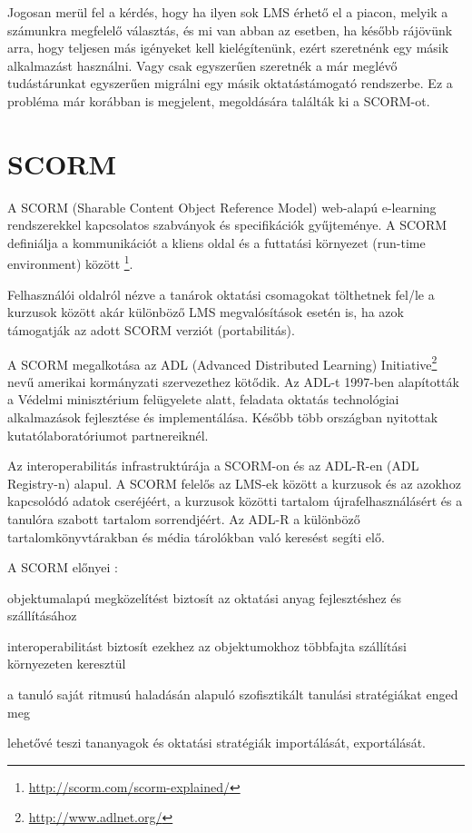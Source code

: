 Jogosan merül fel a kérdés, hogy ha ilyen sok LMS érhető el a piacon, melyik a számunkra megfelelő választás, és mi van abban az esetben, ha később rájövünk arra, hogy teljesen más igényeket kell kielégítenünk, ezért szeretnénk egy másik alkalmazást használni. Vagy csak egyszerűen szeretnék a már meglévő tudástárunkat egyszerűen migrálni egy másik oktatástámogató rendszerbe. Ez a probléma már korábban is megjelent, megoldására találták ki a SCORM-ot.

\section{SCORM}
A SCORM (Sharable Content Object Reference Model) web-alapú e-learning rendszerekkel  kapcsolatos szabványok és specifikációk gyűjteménye. A SCORM definiálja a kommunikációt a kliens oldal és a futtatási környezet (run-time environment) között \footnote{\href{http://scorm.com/scorm-explained/}{http://scorm.com/scorm-explained/}}.

Felhasználói oldalról nézve a tanárok oktatási csomagokat tölthetnek fel/le a kurzusok között akár különböző LMS megvalósítások esetén is, ha azok támogatják az adott SCORM verziót (portabilitás).

A SCORM megalkotása az ADL (Advanced Distributed Learning) Initiative\footnote{\href{http://www.adlnet.org/}{http://www.adlnet.org/}} nevű amerikai kormányzati szervezethez kötődik. Az ADL-t 1997-ben alapították a Védelmi minisztérium felügyelete alatt, feladata oktatás technológiai alkalmazások fejlesztése és implementálása. Később több országban nyitottak kutatólaboratóriumot partnereiknél.

Az interoperabilitás infrastruktúrája a SCORM-on és az ADL-R-en (ADL Registry-n) alapul. A SCORM felelős az LMS-ek között a kurzusok és az azokhoz kapcsolódó adatok cseréjéért, a kurzusok közötti tartalom újrafelhasználásért és a tanulóra szabott tartalom sorrendjéért. Az ADL-R a különböző tartalomkönyvtárakban és média tárolókban való keresést segíti elő.

A SCORM előnyei \cite{sco}:
\begin{sajat_itemize}
\item objektumalapú megközelítést biztosít az oktatási anyag fejlesztéshez és szállításához
\item interoperabilitást biztosít ezekhez az objektumokhoz többfajta szállítási környezeten keresztül
\item a tanuló saját ritmusú haladásán alapuló szofisztikált tanulási stratégiákat enged meg
\item lehetővé teszi tananyagok és oktatási stratégiák importálását, exportálását.
\end{sajat_itemize}
